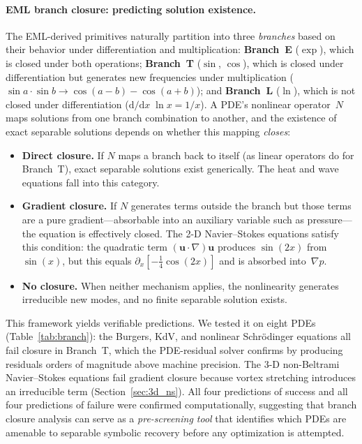 \paragraph{EML branch closure: predicting solution existence.}
The EML-derived primitives naturally partition into three \emph{branches}
based on their behavior under differentiation and multiplication:
\textbf{Branch~E} ($\exp$), which is closed under both operations;
\textbf{Branch~T} ($\sin$, $\cos$), which is closed under differentiation
but generates new frequencies under multiplication
($\sin a \cdot \sin b \to \cos(a\!-\!b) - \cos(a\!+\!b)$); and
\textbf{Branch~L} ($\ln$), which is not closed under differentiation
($\mathrm{d}/\mathrm{d}x\;\ln x = 1/x$).  A PDE's nonlinear operator~$N$
maps solutions from one branch combination to another, and the existence of
exact separable solutions depends on whether this mapping \emph{closes}:
\begin{itemize}
  \item \textbf{Direct closure.}  If $N$ maps a branch back to itself
    (as linear operators do for Branch~T), exact separable solutions exist
    generically.  The heat and wave equations fall into this category.
  \item \textbf{Gradient closure.}  If $N$ generates terms outside the
    branch but those terms are a pure gradient---absorbable into an
    auxiliary variable such as pressure---the equation is effectively
    closed.  The 2-D Navier--Stokes equations satisfy this condition:
    the quadratic term $(\mathbf{u}\!\cdot\!\nabla)\mathbf{u}$ produces
    $\sin(2x)$ from $\sin(x)$, but this equals
    $\partial_x[-\tfrac{1}{4}\cos(2x)]$ and is absorbed into~$\nabla p$.
  \item \textbf{No closure.}  When neither mechanism applies, the
    nonlinearity generates irreducible new modes, and no finite
    separable solution exists.
\end{itemize}
This framework yields verifiable predictions.  We tested it on eight PDEs
(Table~\ref{tab:branch}): the Burgers, KdV, and nonlinear Schr\"{o}dinger
equations all fail closure in Branch~T, which the PDE-residual solver
confirms by producing residuals orders of magnitude above machine precision.
The 3-D non-Beltrami Navier--Stokes equations fail gradient closure
because vortex stretching introduces an irreducible term
(Section~\ref{sec:3d_ns}).  All four predictions of success and all four
predictions of failure were confirmed computationally, suggesting that
branch closure analysis can serve as a \emph{pre-screening tool}
that identifies which PDEs are amenable to separable symbolic
recovery before any optimization is attempted.

